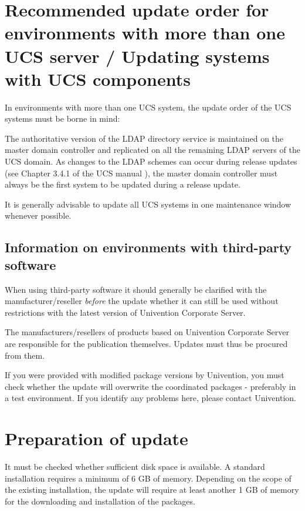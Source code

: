 \chapter{Recommended update order for environments with more than one UCS server / Updating systems with UCS components}

In environments with more than one UCS system, the update order of the
UCS systems must be borne in mind:

The authoritative version of the LDAP directory service
is maintained on the master domain controller and replicated on all the remaining
LDAP servers of the UCS domain. As changes to the LDAP schemes can
occur during release updates (see Chapter 3.4.1 of the UCS
manual \cite{UCS-Handbuch}), the master domain controller must always be the first
system to be updated during a release update.

It is generally advisable to update all UCS systems in one maintenance
window whenever possible. 

\section{Information on environments with third-party software}

When using third-party software it should generally be clarified with
the manufacturer/reseller \emph{before} the update whether it can still
be used without restrictions with the latest version of Univention
Corporate Server. 

The manufacturers/resellers of products based on Univention Corporate
Server are responsible for the publication themselves. Updates must
thus be procured from them.

If you were provided with modified package versions by Univention,
you must check whether the update will overwrite the coordinated
packages - preferably in a test environment. If you identify any
problems here, please contact Univention.



\chapter{Preparation of update}
It must be checked whether sufficient disk space is available. A
standard installation requires a minimum of 6 GB of memory. Depending
on the scope of the existing installation, the update will require at
least another 1 GB of memory for the downloading and installation of
the packages.

